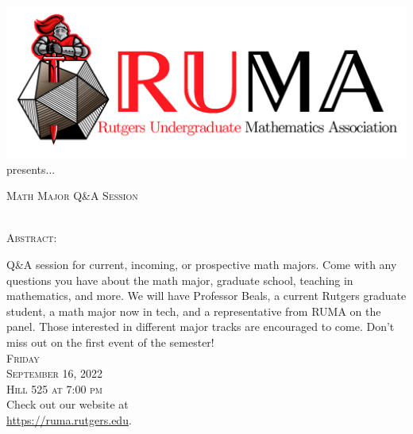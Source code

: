 \documentclass[12pt]{article}
\begin{document}

\begin{center}\includegraphics[scale=.4]{RUMAlogo.png}\\
\large  presents... \\

\vspace{2mm}
\begin{spacing}{1}
{\fontsize{35}{44}\selectfont  \textsc{
Math Major Q\&A Session}} \end{spacing}
 

 ~~\\

\normalsize
\textsc{Abstract:}

\Large 
Q\&A session for current, incoming, or prospective math
majors. Come with any questions you have about the math
major, graduate school, teaching in mathematics, and more. We will
have Professor Beals, a current Rutgers graduate student, a math major now in tech, and a representative from RUMA on the
panel. Those interested in different major tracks are encouraged
to come. Don't miss out on the first event of the semester!\\

\vspace{2.5mm} 
\huge   \textsc{Friday\\September 16, 2022 \\Hill 525 at 7:00 pm} \\
\vspace{2.5mm}
\Large  Check out our website at \\
\url{https://ruma.rutgers.edu}.
\end{center}
\end{document}
